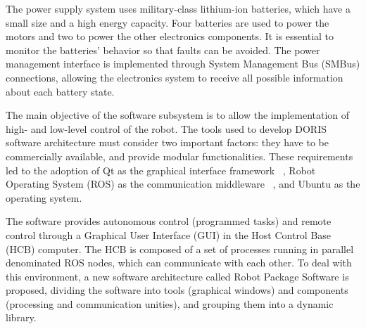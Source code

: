 \documentclass{ifacconf}
\begin{document}
The power supply system uses military-class lithium-ion batteries, which have a
small size and a high energy capacity. Four batteries are used to power the
motors and two to power the other electronics components. It is essential to
monitor the batteries' behavior so that faults can be avoided. The power
management interface is implemented through System Management Bus (SMBus)
connections, allowing the electronics system to receive all possible information about each battery state.


The main objective of the software subsystem is to allow the implementation of
high- and low-level control of the robot. The tools used to develop DORIS
software architecture must consider two important factors: they have to be
commercially available, and provide modular functionalities. These requirements
led to the adoption of Qt as the graphical interface framework ~\cite{qt},
Robot Operating System (ROS) as the communication middleware ~\cite{ros}, and
Ubuntu as the operating system.


The software provides autonomous control (programmed tasks) and remote control
through a Graphical User Interface (GUI) in the Host Control Base (HCB)
computer. The HCB is composed of a set of processes running in parallel
denominated ROS nodes, which can communicate with each other. To deal with this
environment, a new software architecture called Robot Package Software is
proposed, dividing the software into tools (graphical windows) and components
(processing and communication unities), and grouping them into a dynamic
library. %

\end{document}
